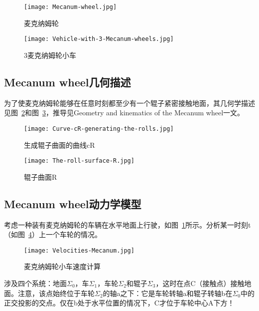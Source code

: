 \begin{figure}
    \begin{minipage}{0.48\textwidth}
      \centering
      \texttt{[image: Mecanum-wheel.jpg]}
      \caption{麦克纳姆轮}
      \label{fig:Mecanum-wheel}
    \end{minipage}\hfill
    \begin{minipage}{0.48\textwidth}
      \centering
      \texttt{[image: Vehicle-with-3-Mecanum-wheels.jpg]}
      \caption{3麦克纳姆轮小车}
      \label{fig:Vehicle-with-3-Mecanum-wheels}
    \end{minipage}
\end{figure}

\subsection{Mecanum wheel几何描述}
为了使麦克纳姆轮能够在任意时刻都至少有一个辊子紧密接触地面，其几何学描述见图~\ref{fig:Curve-cR-generating-the-rolls}和图~\ref{fig:The-roll-surface-R}，推导见Geometry and kinematics of the Mecanum wheel\cite{gfrerrer2008geometry}一文。

\begin{figure}[htbp]
    \centering
    \texttt{[image: Curve-cR-generating-the-rolls.jpg]}
    \caption{生成辊子曲面的曲线cR}
    \label{fig:Curve-cR-generating-the-rolls}
\end{figure}

\begin{figure}[htbp]
    \centering
    \texttt{[image: The-roll-surface-R.jpg]}
    \caption{辊子曲面R}
    \label{fig:The-roll-surface-R}
\end{figure}

\subsection{Mecanum wheel动力学模型}

考虑一种装有麦克纳姆轮的车辆在水平地面上行驶，如图~\ref{fig:Vehicle-with-3-Mecanum-wheels}所示。分析某一时刻t（如图~\ref{fig:Velocities-Mecanum}）上一个车轮的情况。

\begin{figure}[htbp]
    \centering
    \texttt{[image: Velocities-Mecanum.jpg]}
    \caption{麦克纳姆轮小车速度计算}
    \label{fig:Velocities-Mecanum}
\end{figure}

涉及四个系统：地面$\Sigma_{0}$，车$\Sigma_{1}$，车轮$\Sigma_{2}$和辊子$\Sigma_{3}$，这时在点C（接触点）接触地面。注意，该点始终位于车轮$\Sigma_{2}$的轴a之下：它是车轮转轴a和辊子转轴b在$\Sigma_{0}$中的正交投影的交点。仅在b处于水平位置的情况下，C才位于车轮中心A下方！

